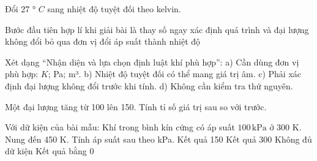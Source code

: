 \begin{ex}
Đổi 27 ° $C$ sang nhiệt độ tuyệt đối theo kelvin.
\end{ex}

\begin{ex}
Bước đầu tiên hợp lí khi giải bài là
\choice
{thay số ngay}
{\True xác định quá trình và đại lượng không đổi}
{bỏ qua đơn vị}
{đổi áp suất thành nhiệt độ}
\end{ex}

\begin{ex}
Xét dạng “Nhận diện và lựa chọn định luật khí phù hợp”: a) Cần dùng đơn vị phù hợp: $K$; Pa; m³. b) Nhiệt độ tuyệt đối có thể mang giá trị âm. c) Phải xác định đại lượng không đổi trước khi tính. d) Không cần kiểm tra thứ nguyên.
\choiceTF

\end{ex}

\begin{ex}
Một đại lượng tăng từ 100 lên 150. Tính tỉ số giá trị sau so với trước.
\end{ex}

\begin{ex}
Với dữ kiện của bài mẫu: Khí trong bình kín cứng có áp suất $100\,\text{kPa}$ ở 300 K. Nung đến 450 K. Tính áp suất sau theo kPa.
\choice
{\True Kết quả 150}
{Kết quả 300}
{Không đủ dữ kiện}
{Kết quả bằng 0}
\end{ex}

